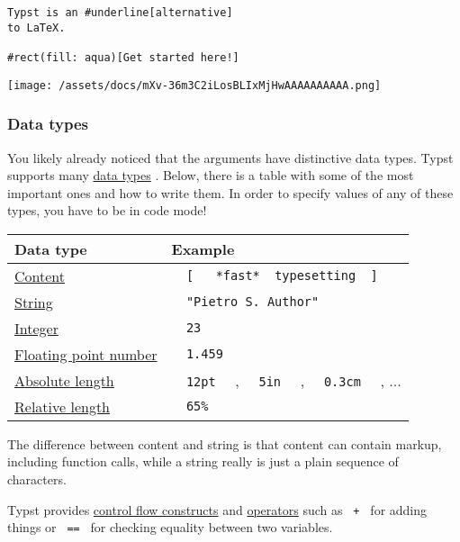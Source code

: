 \begin{verbatim}
Typst is an #underline[alternative]
to LaTeX.

#rect(fill: aqua)[Get started here!]
\end{verbatim}

\texttt{[image: /assets/docs/mXv-36m3C2iLosBLIxMjHwAAAAAAAAAA.png]}

\subsubsection{Data types}\label{data-types}

You likely already noticed that the arguments have distinctive data
types. Typst supports many \href{/docs/reference/foundations/type/}{data
types} . Below, there is a table with some of the most important ones
and how to write them. In order to specify values of any of these types,
you have to be in code mode!

\begin{longtable}[]{@{}ll@{}}
\toprule\noalign{}
Data type & Example \\
\midrule\noalign{}
\endhead
\bottomrule\noalign{}
\endlastfoot
\href{/docs/reference/foundations/content/}{Content} &
\texttt{\ }{\texttt{\ {[}\ }}\texttt{\ }{\texttt{\ *fast*\ }}\texttt{\ typesetting\ }{\texttt{\ {]}\ }}\texttt{\ } \\
\href{/docs/reference/foundations/str/}{String} &
\texttt{\ }{\texttt{\ "Pietro\ S.\ Author"\ }}\texttt{\ } \\
\href{/docs/reference/foundations/int/}{Integer} &
\texttt{\ }{\texttt{\ 23\ }}\texttt{\ } \\
\href{/docs/reference/foundations/float/}{Floating point number} &
\texttt{\ }{\texttt{\ 1.459\ }}\texttt{\ } \\
\href{/docs/reference/layout/length/}{Absolute length} &
\texttt{\ }{\texttt{\ 12pt\ }}\texttt{\ } ,
\texttt{\ }{\texttt{\ 5in\ }}\texttt{\ } ,
\texttt{\ }{\texttt{\ 0.3cm\ }}\texttt{\ } , ... \\
\href{/docs/reference/layout/ratio/}{Relative length} &
\texttt{\ }{\texttt{\ 65\%\ }}\texttt{\ } \\
\end{longtable}

The difference between content and string is that content can contain
markup, including function calls, while a string really is just a plain
sequence of characters.

Typst provides \href{/docs/reference/scripting/\#conditionals}{control
flow constructs} and
\href{/docs/reference/scripting/\#operators}{operators} such as
\texttt{\ +\ } for adding things or \texttt{\ ==\ } for checking
equality between two variables.

